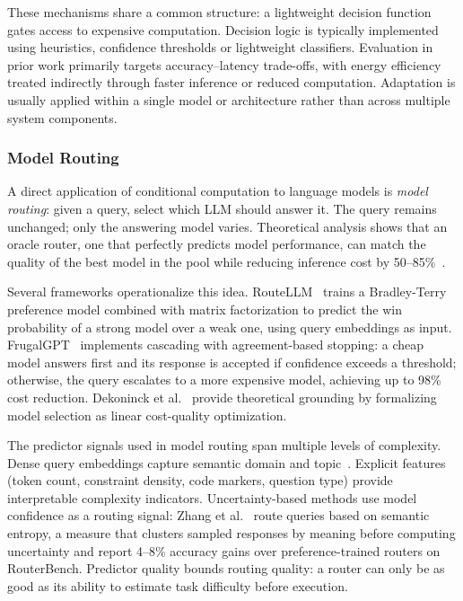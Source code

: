 These mechanisms share a common structure: a lightweight decision function gates 
access to expensive computation. Decision logic is typically implemented using heuristics, 
confidence thresholds or lightweight classifiers. Evaluation in prior work primarily 
targets accuracy--latency trade-offs, with energy efficiency treated indirectly through 
faster inference or reduced computation. Adaptation is usually applied within 
a single model or architecture rather than across multiple system components.



\subsubsection{Model Routing}

A direct application of conditional computation to language models is \emph{model routing}: 
given a query, select which LLM should answer it. The query remains unchanged; only the 
answering model varies. Theoretical analysis shows that an oracle router, one that perfectly 
predicts model performance, can match the quality of the best model in the pool while 
reducing inference cost by 50--85\%~\cite{routerbench2024}.

Several frameworks operationalize this idea. RouteLLM~\cite{routellm2025} trains a 
Bradley-Terry preference model combined with matrix factorization to predict the win 
probability of a strong model over a weak one, using query embeddings as input. 
FrugalGPT~\cite{frugalgpt2023} implements cascading with agreement-based stopping: a 
cheap model answers first and its response is accepted if confidence exceeds a 
threshold; otherwise, the query escalates to a more expensive model, achieving up 
to 98\% cost reduction. Dekoninck et al.~\cite{unifiedrouting2025} provide theoretical 
grounding by formalizing model selection as linear cost-quality optimization.

The predictor signals used in model routing span multiple levels of complexity. 
Dense query embeddings capture semantic domain and topic~\cite{routellm2025}. Explicit 
features (token count, constraint density, code markers, question type) provide 
interpretable complexity indicators. Uncertainty-based methods use model confidence as 
a routing signal: Zhang et al.~\cite{uncertaintyrouting2025} route queries based on 
semantic entropy, a measure that clusters sampled responses by meaning before computing 
uncertainty and report 4--8\% accuracy gains over preference-trained routers on RouterBench. 
Predictor quality bounds routing quality: a router can only be as good as its ability 
to estimate task difficulty before execution.

